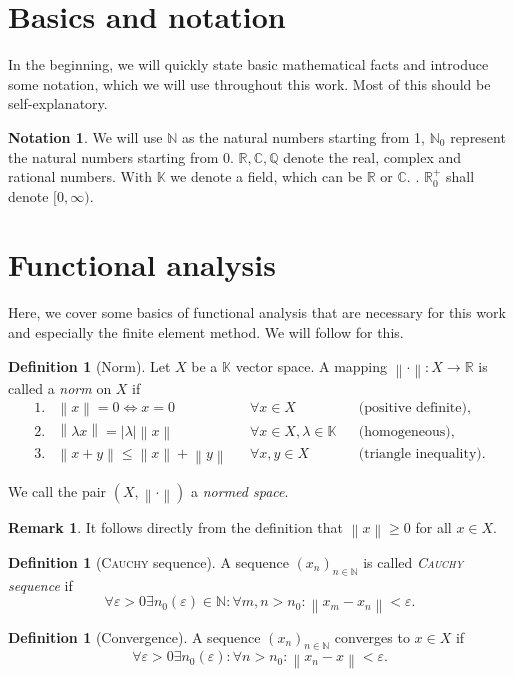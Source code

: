 \documentclass[12pt,a4paper,twoside, open=right]{scrreprt}
\theoremstyle{definition}
\newtheorem{rem}[auf]{Remark}
\newtheorem{defn}[auf]{Definition}
\newtheorem{notation}[auf]{Notation}
\theoremstyle{plain}
\newcommand{\abs}[1]{\left\vert #1\right\vert}
\newcommand{\rr}{\mathbb{R}}
\newcommand{\cc}{\mathbb{C}}
\newcommand{\kk}{\mathbb{K}}
\newcommand{\nn}{\mathbb{N}}
\newcommand{\qq}{\mathbb{Q}}
\newcommand{\norm}[1]{\left\lVert#1\right\rVert}
\begin{document}
\section{Basics and notation}
In the beginning, we will quickly state basic mathematical facts and introduce some notation, which we will use throughout this work. Most of this should be self-explanatory.
\begin{notation}
    We will use $\nn$ as the natural numbers starting from 1, $\nn_0$ represent the natural numbers starting from 0. $\rr,\cc,\qq$ denote the real, complex and rational numbers. With $\kk$ we denote a field, which can be $\rr$ or $\cc$. . $\rr^+_0$ shall denote $[0,\infty)$.
\end{notation} 
\section{Functional analysis}
\label{sec:funcana}
Here, we cover some basics of functional analysis that are necessary for this work and especially the finite element method. We will follow \cite{Ganesan2017} for this.
\begin{defn}[Norm]
    Let $X$ be a $\kk$ vector space. A mapping $\norm{\cdot}\colon X\to\rr$ is called a \emph{norm} on $X$ if 
    \begin{align}
        1. &\norm{x}=0 \Leftrightarrow x=0 &&\forall x\in X  &&\text{(positive definite)},\\
        2. &\norm{\lambda x}=\abs{\lambda}\norm{x} &&\forall x\in X,\lambda\in\kk &&\text{(homogeneous)},\\
        3. &\norm{x+y}\le\norm{x}+\norm{y}&&\forall x,y\in X &&\text{(triangle inequality)}.
    \end{align}

    We call the pair $(X,\norm{\cdot})$ a \emph{normed space}.
\end{defn}
\begin{rem}
    It follows directly from the definition that $\norm{x}\ge 0$ for all $ x\in X$.
\end{rem}
\begin{defn}[\textsc{Cauchy} sequence]
    A sequence $(x_n)_{n\in\nn}$ is called \emph{\textsc{Cauchy} sequence} if
    \begin{equation}
         \forall\varepsilon>0 \exists n_0(\varepsilon)\in\nn\colon \forall m,n>n_0\colon\norm{x_m-x_n}<\varepsilon.
    \end{equation}
\end{defn}
\begin{defn}[Convergence]
    A sequence $(x_n)_{n\in\nn}$ converges to $x\in X$ if 
    \begin{equation}
        \forall\varepsilon>0 \exists n_0(\varepsilon)\colon \forall n>n_0 \colon \norm{x_n -x}<\varepsilon.
    \end{equation}
\end{defn}
\end{document}
